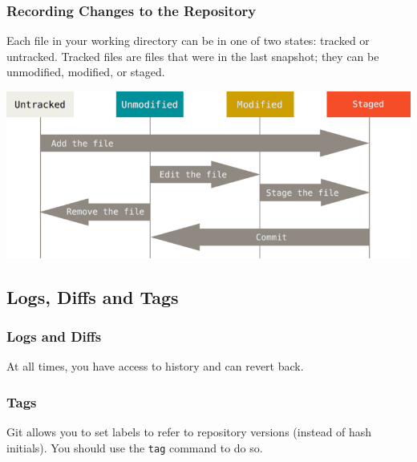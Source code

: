 \begin{frame}
  \frametitle{Recording Changes to the Repository}

  Each file in your working directory can be in one of two states: tracked or untracked.
  Tracked files are files that were in the last snapshot; they can be unmodified, modified, or staged.

  \vspace{1em}

  \begin{center}
    \includegraphics[width=0.9\linewidth]{figures/git-lifecycle}
  \end{center}

\end{frame}

\subsection{Logs, Diffs and Tags}

\begin{frame}
  \frametitle{Logs and Diffs}

  At all times, you have access to history and can revert back.

  \vspace{2em}

  \gitsix

\end{frame}




\begin{frame}
  \frametitle{Tags}

  Git allows you to set labels to refer to repository versions (instead of
  hash initials). You should use the \texttt{tag} command to do so.

  \vspace{2em}

  \gitseven

\end{frame}

